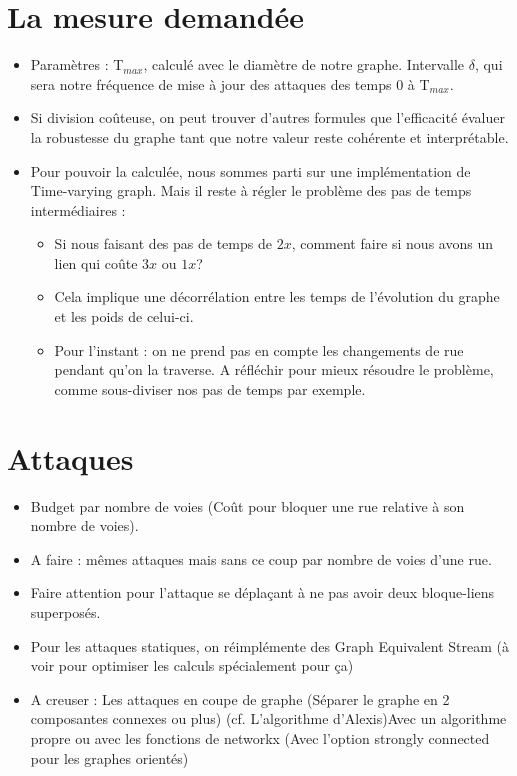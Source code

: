 \documentclass{article}
\begin{document}
\section*{La mesure demandée}
	\begin{itemize}
		\item Paramètres : T${_{max}}$, calculé avec le diamètre de notre graphe. Intervalle ${\delta}$, qui sera notre fréquence de mise à jour des attaques des temps 0 à T${_{max}}$.
		\item Si division coûteuse, on peut trouver d’autres formules que l'efficacité évaluer la robustesse du graphe tant que notre valeur reste cohérente et interprétable.
		\item Pour pouvoir la calculée, nous sommes parti sur une implémentation de Time-varying graph. Mais il reste à régler le problème des pas de temps intermédiaires :
		\begin{itemize}
			\item Si nous faisant des pas de temps de ${2x}$, comment faire si nous avons un lien qui coûte ${3x}$ ou ${1x}$?
			\item Cela implique une décorrélation entre les temps de l’évolution du graphe et les poids de celui-ci.
			\item Pour l’instant : on ne prend pas en compte les changements de rue pendant qu’on la traverse. A réfléchir pour mieux résoudre le problème, comme sous-diviser nos pas de temps par exemple.
		\end{itemize}
	\end{itemize}
	
\section*{Attaques}
	\begin{itemize}
		\item Budget par nombre de voies (Coût pour bloquer une rue relative à son nombre de voies).
		\item A faire : mêmes attaques mais sans ce coup par nombre de voies d’une rue.
		\item Faire attention pour l’attaque se déplaçant à ne pas avoir deux bloque-liens superposés.
		\item Pour les attaques statiques, on réimplémente des Graph Equivalent Stream (à voir pour optimiser les calculs spécialement pour ça)
		\item A creuser : Les attaques en coupe de graphe (Séparer le graphe en 2 composantes connexes ou plus) (cf. L’algorithme d’Alexis)\newline Avec un algorithme propre ou avec les fonctions de networkx (Avec l’option strongly connected pour les graphes orientés)
	\end{itemize}
	
\end{document}
